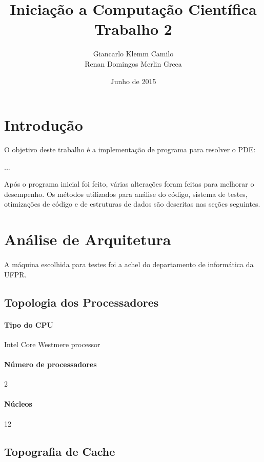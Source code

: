 \documentclass[12pt]{article}
\title{Iniciação a Computação Científica\\Trabalho 2}
\author{
	Giancarlo Klemm Camilo \\
	Renan Domingos Merlin Greca
}
\date{Junho de 2015}
\begin{document}
\maketitle
\newpage	

\tableofcontents
\newpage

\section{Introdução}
O objetivo deste trabalho é a implementação de programa para resolver o PDE:

...

Após o programa inicial foi feito, várias alterações foram feitas para melhorar o desempenho. Os métodos utilizados para análise do código, sistema de testes, otimizações de código e de estruturas de dados são descritas nas seções seguintes.

\newpage

\section{Análise de Arquitetura}
\paragraph{}
A máquina escolhida para testes foi a achel do departamento de informática da UFPR.

\subsection{Topologia dos Processadores}
\paragraph{Tipo do CPU} Intel Core Westmere processor
\paragraph{Número de processadores} 2
\paragraph{Núcleos} 12

\subsection{Topografia de Cache}
\end{document}
